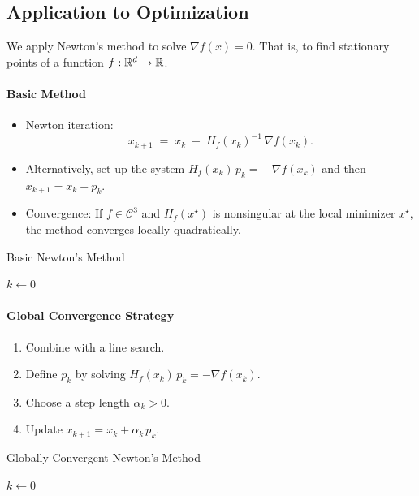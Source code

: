 \subsection*{Application to Optimization}

We apply Newton's method to solve \(\nabla f(x) = 0\). That is, to find stationary points of a function \(f:\mathbb{R}^d \to \mathbb{R}\).

\paragraph{Basic Method}
\begin{itemize}
  \item Newton iteration:
        \[
          x_{k+1} \;=\; x_k \;-\; H_f(x_k)^{-1} \,\nabla f(x_k).
        \]
  \item Alternatively, set up the system \(H_f(x_k)\,p_k = -\,\nabla f(x_k)\) and then \(x_{k+1} = x_k + p_k\).
  \item Convergence: If \(f\in \mathcal{C}^3\) and \(H_f(x^\star)\) is nonsingular at the local minimizer \(x^\star\), the method converges locally quadratically.
\end{itemize}

\begin{algorithm}[H]
  \caption{Basic Newton's Method}
  \label{alg:newton-basic}
  \(k \gets 0\)\;
  \;
\end{algorithm}

\paragraph{Global Convergence Strategy}
\begin{enumerate}
  \item Combine with a line search.
  \item Define \(p_k\) by solving \(H_f(x_k)\,p_k = -\nabla f(x_k)\).
  \item Choose a step length \(\alpha_k > 0\).
  \item Update \(x_{k+1} = x_k + \alpha_k \, p_k\).
\end{enumerate}

\begin{algorithm}[H]
  \caption{Globally Convergent Newton's Method}
  \label{alg:newton-global}
  \(k \gets 0\)\;
  \;
\end{algorithm}

